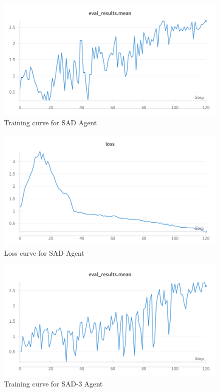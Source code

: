   
  \begin{figure}[h]
    \centering
    \includegraphics[width=\linewidth]{results/SAD-mean.png}
    \caption{
      Training curve for SAD Agent
    }
    \label{fig:sad}
  \end{figure}
  
\begin{figure}[h]
  \centering
  \includegraphics[width=\linewidth]{results/SAD-loss.png}
  \caption{
      Loss curve for SAD Agent
  }
  \label{fig:sadloss}
\end{figure}


  \begin{figure}[h]
    \centering
    \includegraphics[width=\linewidth]{results/SAD-3-mean.png}
    \caption{
      Training curve for SAD-3 Agent
    }
    \label{fig:sad3mean}
  \end{figure}

